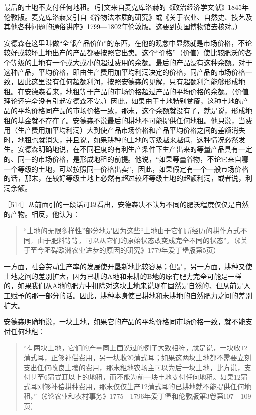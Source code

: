最后的土地不支付任何地租。（引文来自麦克库洛赫的《政治经济学文献》1845年伦敦版。麦克库洛赫又引自《谷物法本质的研究》或《关于农业、自然史、技艺及其他各种问题的通俗讲座》1799—1802年伦敦版。这要到英国博物馆去核对。）

安德森在这里叫做“全部产品价值”的东西，在他的观念中显然就是市场价格，不论较好或较坏土地出产的产品都要按照它出卖。这个“价格”（价值）使比较肥沃的各个等级的土地有一个或大或小的超过费用的余额。最后的产品没有这种余额。对于这种产品，平均价格，即由生产费用加平均利润决定的价格，同产品的市场价格一致，因此这里没有任何超额利润，按照安德森的见解，只有超额利润能够形成地租。在安德森看来，地租等于产品的市场价格超过产品的平均价格的余额。（价值理论还完全没有引起安德森不安。）因此，如果由于土地特别贫瘠，这种土地的产品的平均价格同产品的市场价格一致，那末，这个余额就没有了，就是说，形成地租的基金就不存在了。安德森不说最后的耕地不可能提供任何地租。他只说，当费用（生产费用加平均利润）大到使产品市场价格和产品平均价格之间的差额消失时，地租也就消失，并且说，如果耕种的土地的等级越来越低，这种情况必然发生。安德森明确地说，在不同程度的有利生产条件下生产出来的等量产品具有一定的、同一的市场价格，是形成地租的前提。他说，“如果等量谷物，不论它来自哪一个等级的土地，可以按照同一价格出卖”，因此，如果假定有一个一般市场价格的话，那末，在较好等级土地上必然有超过较坏等级土地的超额利润，或者说，利润余额。

［514］从前面引的一段话可以看出，安德森决不认为不同的肥沃程度仅仅是自然的产物。相反，他认为：

\begin{quote}{“土地的无限多样性”部分地是因为这些“土地由于它们所经历的耕作方式不同，由于肥料等等，可以从它们的原始状态改变成完全不同的状态”。（《关于至今阻碍欧洲农业进步的原因的研究》1779年爱丁堡版第5页）}\end{quote}

一方面，社会劳动生产率的发展使开垦新地比较容易；但是，另一方面，耕种又使土地之间的差别扩大，因为已耕的A地和未耕的B地的原有肥力完全可能是一样的，如果我们从A地的肥力中扣除对这块土地来说现在固然是自然的、但从前是人工赋予的那一部分的话。因此，耕种本身使已耕地和未耕地的自然肥力之间的差别扩大。

安德森明确地说，一块土地，如果它的产品的平均价格同市场价格一致，就不能支付任何地租：

\begin{quote}{“有两块土地，它们的产量同上面说过的例子大致相符，就是说，一块收12蒲式耳，正够补偿费用，另一块收20蒲式耳；如果这两块土地都不需要立刻支出任何改良土壤的费用，那末租地农场主可以为后一块土地，比方说，支付甚至6蒲式耳以上的地租，而不能为前一块土地支付任何地租。如果12蒲式耳刚够补偿耕种费用，那末仅仅生产12蒲式耳的已耕地就不能提供任何地租。”（《论农业和农村事务》1775—1796年爱丁堡和伦敦版第3卷第107—109页）}\end{quote}

